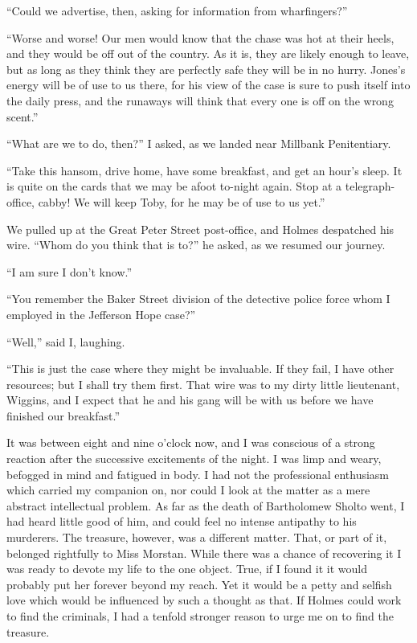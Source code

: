 \documentclass[12pt,english,oneside]{book}
\begin{document}
{}``Could we advertise, then, asking for information from wharfingers?''

{}``Worse and worse! Our men would know that the chase was hot at
their heels, and they would be off out of the country. As it is, they
are likely enough to leave, but as long as they think they are perfectly
safe they will be in no hurry. Jones's energy will be of use to us
there, for his view of the case is sure to push itself into the daily
press, and the runaways will think that every one is off on the wrong
scent.''

{}``What are we to do, then?'' I asked, as we landed near Millbank
Penitentiary.

{}``Take this hansom, drive home, have some breakfast, and get an
hour's sleep. It is quite on the cards that we may be afoot to-night
again. Stop at a telegraph-office, cabby! We will keep Toby, for he
may be of use to us yet.''

We pulled up at the Great Peter Street post-office, and Holmes despatched
his wire. {}``Whom do you think that is to?'' he asked, as we resumed
our journey.

{}``I am sure I don't know.''

{}``You remember the Baker Street division of the detective police
force whom I employed in the Jefferson Hope case?''

{}``Well,'' said I, laughing.

{}``This is just the case where they might be invaluable. If they
fail, I have other resources; but I shall try them first. That wire
was to my dirty little lieutenant, Wiggins, and I expect that he and
his gang will be with us before we have finished our breakfast.''

It was between eight and nine o'clock now, and I was conscious of
a strong reaction after the successive excitements of the night. I
was limp and weary, befogged in mind and fatigued in body. I had not
the professional enthusiasm which carried my companion on, nor could
I look at the matter as a mere abstract intellectual problem. As far
as the death of Bartholomew Sholto went, I had heard little good of
him, and could feel no intense antipathy to his murderers. The treasure,
however, was a different matter. That, or part of it, belonged rightfully
to Miss Morstan. While there was a chance of recovering it I was ready
to devote my life to the one object. True, if I found it it would
probably put her forever beyond my reach. Yet it would be a petty
and selfish love which would be influenced by such a thought as that.
If Holmes could work to find the criminals, I had a tenfold stronger
reason to urge me on to find the treasure.
\end{document}

